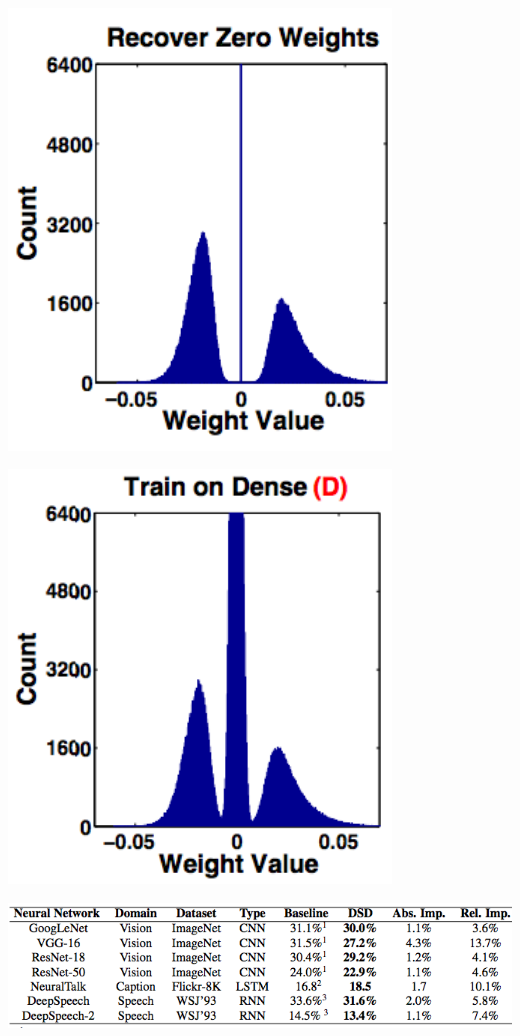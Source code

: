 {\vfill
\centerline{\includegraphics[width = 4in]{../images/DSD4}}


\vfill
\centerline{\includegraphics[width = 4in]{../images/DSD5}}


\vfill
\centerline{\includegraphics[width = 9.5in]{../images/DSDtable}}

}
